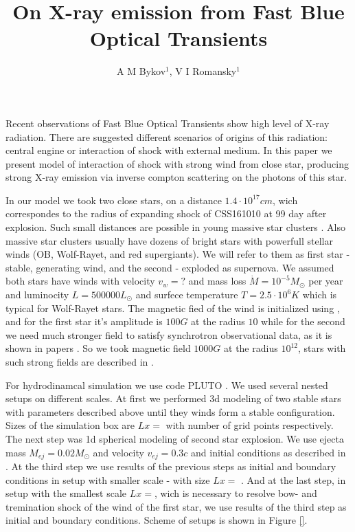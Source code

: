 \documentclass[a4paper,12pt]{extreport}
\begin{document}
	\title{On X-ray emission from Fast Blue Optical Transients}
	
	\author{A M Bykov$^{1}$, V I Romansky$^{1}$}
	

Recent observations of Fast Blue Optical Transients \cite{Margutti2019,Ho2020,Coppejans2020} show high level of X-ray radiation. There are suggested different scenarios of  origins of this radiation: central engine or interaction of shock with external medium. In this paper we present model of interaction of shock with strong wind from close star, producing strong X-ray emission via inverse compton scattering on the photons of this star.


In our model we took two close stars, on a distance $1.4\cdot10^{17} cm$, wich correspondes to the radius of expanding shock of CSS161010 at 99 day after explosion. Such small distances are possible in young massive star clusters \cite{}. Also massive star clusters usually have dozens of bright stars with powerfull stellar winds (OB, Wolf-Rayet, and red supergiants). We will refer to them as first star - stable, generating wind, and the second - exploded as supernova. We assumed both stars have winds with velocity $v_w = ?$ and mass loss $\dot{M} = 10^{-5} M_\odot $ per year and luminocity $L=500000 L_\odot$ and surfece temperature $T = 2.5\cdot10^6 K$ which is typical for Wolf-Rayet stars. The magnetic fied of the wind is initialized using \cite{}, and for the first star  it's amplitude is $100 G$ at the radius $10$ while for the second we need much stronger field to satisfy synchrotron observational data, as it is shown in papers \cite{Coppejans2020, BykovUniverse}. So we took magnetic field $1000 G$ at the radius $10^12$, stars with such strong fields are described in \cite{}.

For hydrodinamcal simulation we use code PLUTO \cite{MignonePluto}. We used several nested setups on different scales. At first we performed 3d modeling of two stable stars with parameters described above until they winds form a stable configuration. Sizes of the simulation box are $Lx = $ with number of grid points respectively. The next step was 1d spherical modeling of second star explosion. We use ejecta mass $M_{ej} = 0.02 M_\odot$ and velocity $v_{ej} = 0.3 c$ and initial conditions as described in \cite{}. At the third step we use results of the previous steps as initial and boundary conditions in setup with smaller scale - with size $Lx = $ . And at the last step, in setup with the smallest scale $Lx = $, wich is necessary to resolve bow- and tremination shock of the wind of the first star, we use results of the third step as initial and boundary conditions. Scheme of setups is shown in Figure \ref{}.



\end{document}
